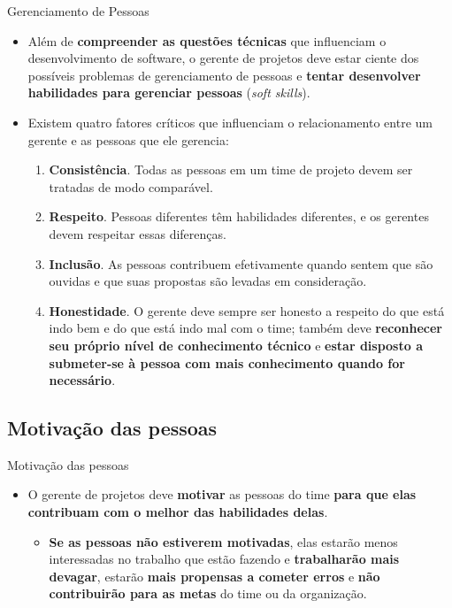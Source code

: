 \documentclass{beamer}
\begin{document}
\begin{frame}{Gerenciamento de Pessoas}
	\begin{itemize}
		\justifying
		\item<1> Além de \textbf{compreender as questões técnicas} que influenciam o desenvolvimento de software, o gerente de projetos deve estar ciente dos possíveis problemas de gerenciamento de pessoas e \textbf{tentar desenvolver habilidades para gerenciar pessoas} (\textit{soft skills}).
		\item<2-> Existem quatro fatores críticos que influenciam o relacionamento entre um gerente e as pessoas que ele gerencia:
			\begin{enumerate}
				\justifying
				\item<3> \textbf{Consistência}. Todas as pessoas em um time de projeto devem ser tratadas de modo comparável.
				\item<4> \textbf{Respeito}. Pessoas diferentes têm habilidades diferentes, e os gerentes devem respeitar essas diferenças.
				\item<5> \textbf{Inclusão}. As pessoas contribuem efetivamente quando sentem que são ouvidas e que suas propostas são levadas em consideração.
				\item<6> \textbf{Honestidade}. O gerente deve sempre ser honesto a respeito do que está indo bem e do que está indo mal com o time; também deve \textbf{reconhecer seu próprio nível de conhecimento técnico} e \textbf{estar disposto a submeter-se à pessoa com mais conhecimento quando for necessário}.
			\end{enumerate}
	\end{itemize}
\end{frame}

\subsection{Motivação das pessoas}

\begin{frame}{Motivação das pessoas}
	\begin{itemize}
		\justifying
		\item O gerente de projetos deve \textbf{motivar} as pessoas do time \textbf{para que elas contribuam com o melhor das habilidades delas}.
			\begin{itemize}
				\justifying
				\item \textbf{Se as pessoas não estiverem motivadas}, elas estarão menos interessadas no trabalho que estão fazendo e \textbf{trabalharão mais devagar}, estarão \textbf{mais propensas a cometer erros} e \textbf{não contribuirão para as metas} do time ou da organização.
			\end{itemize}
	\end{itemize}
\end{frame}
\end{document}
